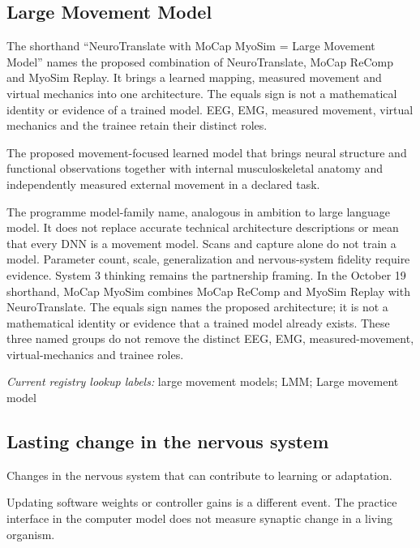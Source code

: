 \subsection*{Large Movement Model}
\noindent The shorthand ``NeuroTranslate with MoCap MyoSim = Large Movement Model'' names the proposed combination of NeuroTranslate, MoCap ReComp and MyoSim Replay. It brings a learned mapping, measured movement and virtual mechanics into one architecture. The equals sign is not a mathematical identity or evidence of a trained model. EEG, EMG, measured movement, virtual mechanics and the trainee retain their distinct roles.\par
\noindent The proposed movement-focused learned model that brings neural structure and functional observations together with internal musculoskeletal anatomy and independently measured external movement in a declared task.\par
\noindent The programme model-family name, analogous in ambition to large language model. It does not replace accurate technical architecture descriptions or mean that every DNN is a movement model. Scans and capture alone do not train a model. Parameter count, scale, generalization and nervous-system fidelity require evidence. System 3 thinking remains the partnership framing. In the October 19 shorthand, MoCap MyoSim combines MoCap ReComp and MyoSim Replay with NeuroTranslate. The equals sign names the proposed architecture; it is not a mathematical identity or evidence that a trained model already exists. These three named groups do not remove the distinct EEG, EMG, measured-movement, virtual-mechanics and trainee roles.\par

\noindent\textit{Current registry lookup labels:} large movement models; LMM; Large movement model\par

\begin{samepage}
\subsection*{Lasting change in the nervous system}
\noindent Changes in the nervous system that can contribute to learning or adaptation.\par
\end{samepage}
\begin{samepage}
\noindent Updating software weights or controller gains is a different event. The practice interface in the computer model does not measure synaptic change in a living organism.\par\nopagebreak[4]

\end{samepage}


